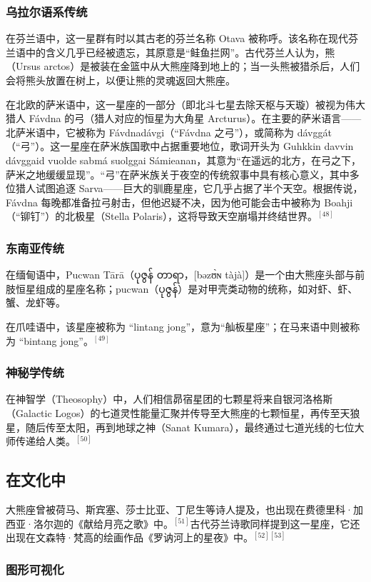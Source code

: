 \subsubsection{乌拉尔语系传统}  
在芬兰语中，这一星群有时以其古老的芬兰名称 Otava 被称呼。该名称在现代芬兰语中的含义几乎已经被遗忘，其原意是“鲑鱼拦网”。古代芬兰人认为，熊（Ursus arctos）是被装在金篮中从大熊座降到地上的；当一头熊被猎杀后，人们会将熊头放置在树上，以便让熊的灵魂返回大熊座。

在北欧的萨米语中，这一星座的一部分（即北斗七星去除天枢与天璇）被视为伟大猎人 Fávdna 的弓（猎人对应的恒星为大角星 Arcturus）。在主要的萨米语言——北萨米语中，它被称为 Fávdnadávgi（“Fávdna 之弓”），或简称为 dávggát（“弓”）。这一星座在萨米族国歌中占据重要地位，歌词开头为 Guhkkin davvin dávggaid vuolde sabmá suolggai Sámieanan，其意为“在遥远的北方，在弓之下，萨米之地缓缓显现”。“弓”在萨米族关于夜空的传统叙事中具有核心意义，其中多位猎人试图追逐 Sarva——巨大的驯鹿星座，它几乎占据了半个天空。根据传说，Fávdna 每晚都准备拉弓射击，但他迟疑不决，因为他可能会击中被称为 Boahji（“铆钉”）的北极星（Stella Polaris），这将导致天空崩塌并终结世界。$^{[48]}$
\subsubsection{东南亚传统}  
在缅甸语中，Pucwan Tārā（ပုဇွန် တာရာ，[bəzʊ̀ɴ tàjà]）是一个由大熊座头部与前肢恒星组成的星座名称；pucwan（ပုဇွန်）是对甲壳类动物的统称，如对虾、虾、蟹、龙虾等。

在爪哇语中，该星座被称为 “lintang jong”，意为“舢板星座”；在马来语中则被称为 “bintang jong”。$^{[49]}$
\subsubsection{神秘学传统}  
在神智学（Theosophy）中，人们相信昴宿星团的七颗星将来自银河洛格斯（Galactic Logos）的七道灵性能量汇聚并传导至大熊座的七颗恒星，再传至天狼星，随后传至太阳，再到地球之神（Sanat Kumara），最终通过七道光线的七位大师传递给人类。$^{[50]}$
\subsection{在文化中}  
大熊座曾被荷马、斯宾塞、莎士比亚、丁尼生等诗人提及，也出现在费德里科·加西亚·洛尔迦的《献给月亮之歌》中。$^{[51]}$古代芬兰诗歌同样提到这一星座，它还出现在文森特·梵高的绘画作品《罗讷河上的星夜》中。$^{[52][53]}$
\subsubsection{图形可视化}
